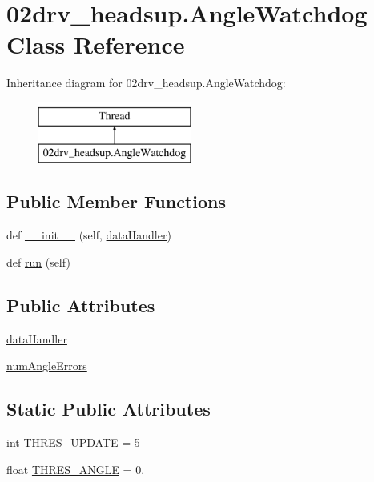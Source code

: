 \hypertarget{class02drv__headsup_1_1_angle_watchdog}{}\section{02drv\+\_\+headsup.Angle\+Watchdog Class Reference}
\label{class02drv__headsup_1_1_angle_watchdog}
Inheritance diagram for 02drv\+\_\+headsup.Angle\+Watchdog\+:\begin{figure}[H]
\begin{center}
\leavevmode
\includegraphics[height=2.000000cm]{class02drv__headsup_1_1_angle_watchdog}
\end{center}
\end{figure}
\subsection*{Public Member Functions}
\begin{DoxyCompactItemize}
\item 
def \hyperlink{class02drv__headsup_1_1_angle_watchdog_ae01cf071231bf621f87be4cbd3e1270a}{\+\_\+\+\_\+init\+\_\+\+\_\+} (self, \hyperlink{class02drv__headsup_1_1_angle_watchdog_a01d8445bc9bc297f146e4b2b1ac8c3cf}{data\+Handler})
\item 
def \hyperlink{class02drv__headsup_1_1_angle_watchdog_a32170b0b071a93dd8dc28c8914e668fd}{run} (self)
\end{DoxyCompactItemize}
\subsection*{Public Attributes}
\begin{DoxyCompactItemize}
\item 
\hyperlink{class02drv__headsup_1_1_angle_watchdog_a01d8445bc9bc297f146e4b2b1ac8c3cf}{data\+Handler}
\item 
\hyperlink{class02drv__headsup_1_1_angle_watchdog_adb1811c39b9a7621159c44ac365d806a}{num\+Angle\+Errors}
\end{DoxyCompactItemize}
\subsection*{Static Public Attributes}
\begin{DoxyCompactItemize}
\item 
int \hyperlink{class02drv__headsup_1_1_angle_watchdog_a0c36bfb45868e616a57d7402f4ad234c}{T\+H\+R\+E\+S\+\_\+\+U\+P\+D\+A\+TE} = 5
\item 
float \hyperlink{class02drv__headsup_1_1_angle_watchdog_a87839c1f430c8213859fc04ccc21c877}{T\+H\+R\+E\+S\+\_\+\+A\+N\+G\+LE} = 0.
\end{DoxyCompactItemize}


